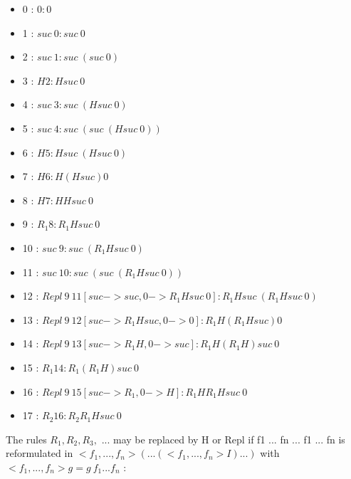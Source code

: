 \documentclass[10pt]{article}
\begin{document}
\begin{itemize}
     \setlength{\itemsep}{1pt}
     \setlength{\parskip}{0pt}
     \setlength{\parsep}{0pt}

\item    0 : \( 0 : 0 \)
\item    1 : \( suc\ 0 : suc\ 0 \)
\item    2 : \( suc\ 1 : suc\ (suc\ 0) \)
\item    3 : \( H 2 : H suc\ 0 \)
\item    4 : \( suc\ 3 : suc\ (H suc\ 0) \)
\item    5 : \( suc\ 4 : suc\ (suc\ (H suc\ 0)) \)
\item    6 : \( H 5 : H suc\ (H suc\ 0) \)
\item    7 : \( H 6 : H (H suc) 0 \)
\item    8 : \( H 7 : H H suc\ 0 \)
\item    9 : \( R_1 8 : R_1 H suc\ 0 \)
\item    10 : \( suc\ 9 : suc\ (R_1 H suc\ 0) \)
\item    11 : \( suc\ 10 : suc\ (suc\ (R_1 H suc\ 0)) \)
\item    12 : \( Repl\ 9\ 11 [suc->suc,0->R_1 H suc\ 0] : R_1 H suc\ (R_1 H suc\ 0) \)
\item    13 : \( Repl\ 9\ 12 [suc->R_1 H suc,0->0] : R_1 H (R_1 H suc) 0 \)
\item    14 : \( Repl\ 9\ 13 [suc->R_1 H,0->suc] : R_1 H (R_1 H) suc\ 0 \)
\item    15 : \( R_1 14 : R_1 (R_1 H) suc\ 0 \)
\item    16 : \( Repl\ 9\ 15 [suc->R_1,0->H] : R_1 H R_1 H suc\ 0 \)
\item    17 : \( R_2 16 : R_2 R_1 H suc\ 0  \)

\end{itemize}

The rules \( R_1, R_2, R_3, \) ... may be replaced by H or Repl if f1 ... fn ... f1 ... fn 
is reformulated in \( <f_1,...,f_n> ( ... (<f_1,...,f_n> I)...) \) with \( <f_1,...,f_n> g = g\ f_1 ... f_n \) :
\end{document}
